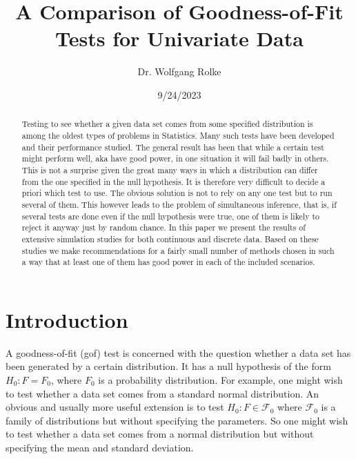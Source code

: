\documentclass[]{svjour3}
\begin{document}
\title{A Comparison of Goodness-of-Fit Tests for Univariate Data}
\author{Dr. Wolfgang Rolke}
\date{9/24/2023}
\maketitle

\begin{abstract}

Testing to see whether a given data set comes from some specified distribution is among the oldest types of problems in Statistics. Many such tests have been developed and their performance studied. The general result has been that while a certain test might perform well, aka have good power, in one situation it will fail badly in others. This is not a surprise given the great many ways in which a distribution can differ from the one specified in the null hypothesis. It is therefore very difficult to decide a priori which test to use. The obvious solution is not to rely on any one test but to run several of them. This however leads to the problem of simultaneous inference, that is, if several tests are done even if the null hypothesis were true, one of them is likely to reject it anyway just by random chance. In this paper we present the results of extensive simulation studies for both continuous and discrete data. Based on these studies we make recommendations for a fairly small number of methods chosen in such a way that at least one of them has good power in each of the included scenarios. 

\end{abstract}


\section{Introduction}


A goodness-of-fit (gof) test is concerned with the question whether a data set has been generated by a certain distribution. It has a null
hypothesis of the form \(H_0: F=F_0\), where \(F_0\) is a probability
distribution. For example, one might wish to test whether a data set
comes from a standard normal distribution. An obvious and usually more
useful extension is to test \(H_0: F \in \mathscr{F}_0\) where \(\mathscr{F}_0\) is a family of
distributions but without specifying the parameters. So one might wish
to test whether a data set comes from a normal distribution but without
specifying the mean and standard deviation. 
\end{document}
